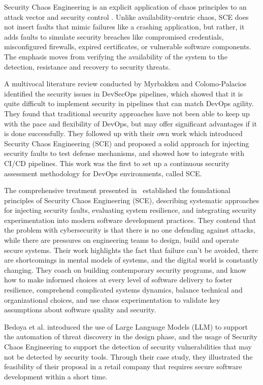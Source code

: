 \documentclass[conference,10pt]{IEEEtran}
\begin{document}
Security Chaos Engineering is an explicit application of chaos principles to an attack vector and security control \cite{myrbakken2021security}. Unlike availability-centric chaos, SCE does not insert faults that mimic failures like a crashing application, but rather, it adds faults to simulate security breaches like compromised credentials, misconfigured firewalls, expired certificates, or vulnerable software components. The emphasis moves from verifying the availability of the system to the detection, resistance and recovery to security threats. 

A multivocal literature review conducted by Myrbakken and Colomo-Palacios \cite{myrbakken2020security} identified the security issues in DevSecOps pipelines, which showed that it is quite difficult to implement security in pipelines that can match DevOps agility. They found that traditional security approaches have not been able to keep up with the pace and flexibility of DevOps, but may offer significant advantages if it is done successfully. They followed up with their own work \cite{myrbakken2021security} which introduced Security Chaos Engineering (SCE) and proposed a solid approach for injecting security faults to test defense mechanisms, and showed how to integrate with CI/CD pipelines. This work was the first to set up a continuous security assessment methodology for DevOps environments, called SCE.

The comprehensive treatment presented in~\cite{shortridge2023security} established the foundational principles of Security Chaos Engineering (SCE), describing systematic approaches for injecting security faults, evaluating system resilience, and integrating security experimentation into modern software development practices. They contend that the problem with cybersecurity is that there is no one defending against attacks, while there are pressures on engineering teams to design, build and operate secure systems. Their work highlights the fact that failure can't be avoided, there are shortcomings in mental models of systems, and the digital world is constantly changing. They coach on building contemporary security programs, and know how to make informed choices at every level of software delivery to foster resilience, comprehend complicated systems dynamics, balance technical and organizational choices, and use chaos experimentation to validate key assumptions about software quality and security.

Bedoya et al. \cite{bedoya2024enhancing} introduced the use of Large Language Models (LLM) to support the automation of threat discovery in the design phase, and the usage of Security Chaos Engineering to support the detection of security vulnerabilities that may not be detected by security tools. Through their case study, they illustrated the feasibility of their proposal in a retail company that requires secure software development within a short time. 
\end{document}
